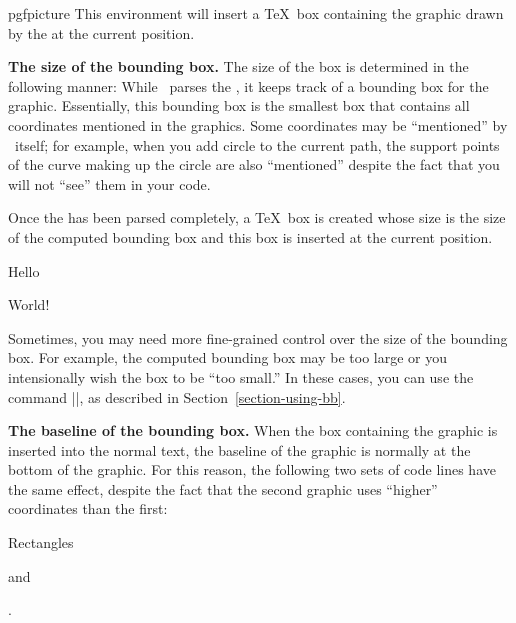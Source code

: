 \begin{environment}{{pgfpicture}}
  This environment will insert a \TeX\ box containing the graphic drawn by
  the  at the current position. 

  \medskip
  \textbf{The size of the bounding box.}
  The size of the box is determined in the following
  manner: While \pgfname\ parses the , it
  keeps track of a bounding box for the graphic. Essentially, this
  bounding box is the smallest box that contains all coordinates
  mentioned in the graphics. Some coordinates may be ``mentioned'' by
  \pgfname\ itself; for example, when you add circle to the current
  path, the support points of the curve making up the circle are also
  ``mentioned'' despite the fact that you will not ``see'' them in
  your code.

  Once the  has been parsed completely, a
  \TeX\ box is created whose size is the size of the computed bounding
  box and this box is inserted at the current position.

\begin{codeexample}[]
Hello \begin{pgfpicture}
  \pgfpathrectangle{\pgfpointorigin}{\pgfpoint{2ex}{1ex}}
\end{pgfpicture} World!
\end{codeexample}

  Sometimes, you may need more fine-grained control over the size of
  the bounding box. For example, the computed bounding box may be too
  large or you intensionally wish the box to be ``too small.'' In
  these cases, you can use the command
  ||, as described in
  Section~\ref{section-using-bb}.


  \medskip
  \textbf{The baseline of the bounding box.}
  When the box containing the graphic is inserted into the normal
  text, the baseline of the graphic is normally at the bottom of the
  graphic. For this reason, the following two sets of code lines have
  the same effect, despite the fact that the second graphic uses
  ``higher'' coordinates than the first:
 
\begin{codeexample}[]
Rectangles \begin{pgfpicture}
  \pgfpathrectangle{\pgfpointorigin}{\pgfpoint{2ex}{1ex}}
\end{pgfpicture} and \begin{pgfpicture}
  \pgfpathrectangle{\pgfpoint{0ex}{1ex}}{\pgfpoint{2ex}{1ex}}
\end{pgfpicture}.
\end{codeexample}


\end{environment}
